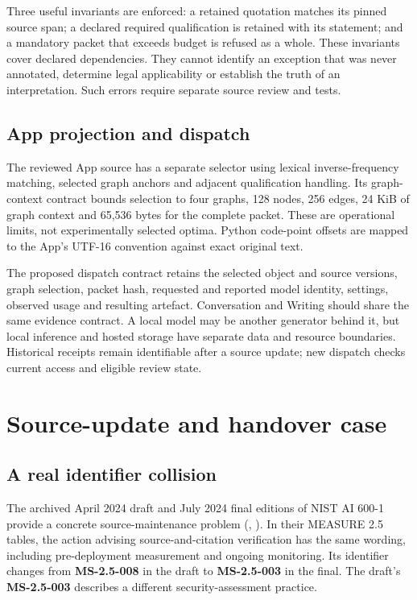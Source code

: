 \documentclass[
  11pt,
]{article}
\let\originalsection\section
\renewcommand{\section}{\Needspace{5\baselineskip}\originalsection}
\begin{document}
Three useful invariants are enforced: a retained quotation matches its
pinned source span; a declared required qualification is retained with
its statement; and a mandatory packet that exceeds budget is refused as
a whole. These invariants cover declared dependencies. They cannot
identify an exception that was never annotated, determine legal
applicability or establish the truth of an interpretation. Such errors
require separate source review and tests.

\subsection{App projection and
dispatch}\label{app-projection-and-dispatch}

The reviewed App source has a separate selector using lexical
inverse-frequency matching, selected graph anchors and adjacent
qualification handling. Its graph-context contract bounds selection to
four graphs, 128 nodes, 256 edges, 24 KiB of graph context and 65,536
bytes for the complete packet. These are operational limits, not
experimentally selected optima. Python code-point offsets are mapped to
the App's UTF-16 convention against exact original text.

The proposed dispatch contract retains the selected object and source
versions, graph selection, packet hash, requested and reported model
identity, settings, observed usage and resulting artefact. Conversation
and Writing should share the same evidence contract. A local model may
be another generator behind it, but local inference and hosted storage
have separate data and resource boundaries. Historical receipts remain
identifiable after a source update; new dispatch checks current access
and eligible review state.

\section{Source-update and handover
case}\label{source-update-and-handover-case}

\subsection{A real identifier
collision}\label{a-real-identifier-collision}

The archived April 2024 draft and July 2024 final editions of NIST AI
600-1 provide a concrete source-maintenance problem
(, ). In their
MEASURE 2.5 tables, the action advising source-and-citation verification
has the same wording, including pre-deployment measurement and ongoing
monitoring. Its identifier changes from \textbf{MS-2.5-008} in the draft
to \textbf{MS-2.5-003} in the final. The draft's \textbf{MS-2.5-003}
describes a different security-assessment practice.
\end{document}
